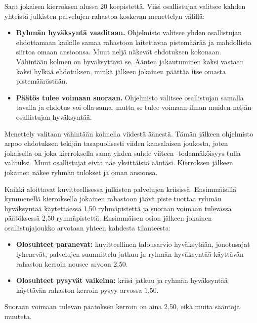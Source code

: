 Saat jokaisen kierroksen alussa 20 koepistettä. Viisi osallistujaa valitsee kahden yhteistä julkisten palvelujen rahastoa koskevan menettelyn välillä:
\begin{itemize}
  \item \textbf{Ryhmän hyväksyntä vaaditaan.} Ohjelmisto valitsee yhden osallistujan ehdottamaan kaikille samaa rahastoon laitettavaa pistemäärää ja mahdollista siirtoa omaan ansioonsa. Muut neljä näkevät ehdotuksen kokonaan. Vähintään kolmen on hyväksyttävä se. Äänten jakautuminen kaksi vastaan kaksi hylkää ehdotuksen, minkä jälkeen jokainen päättää itse omasta pistemäärästään.
  \item \textbf{Päätös tulee voimaan suoraan.} Ohjelmisto valitsee osallistujan samalla tavalla ja ehdotus voi olla sama, mutta se tulee voimaan ilman muiden neljän osallistujan hyväksyntää.
\end{itemize}
Menettely valitaan vähintään kolmella viidestä äänestä. Tämän jälkeen ohjelmisto arpoo ehdotuksen tekijän tasapuolisesti viiden kansalaisen joukosta, joten jokaisella on joka kierroksella sama yhden suhde viiteen -todennäköisyys tulla valituksi. Muut osallistujat eivät näe yksittäistä ääntäsi. Kierroksen jälkeen jokainen näkee ryhmän tulokset ja oman ansionsa.

\begin{infobox}
Kaikki aloittavat kuvitteellisessa julkisten palvelujen kriisissä. Ensimmäisillä kymmenellä kierroksella jokainen rahastoon jäävä piste tuottaa ryhmän hyväksyntää käytettäessä 1,50 ryhmäpistettä ja suoraan voimaan tulevassa päätöksessä 2,50 ryhmäpistettä. Ensimmäisen osion jälkeen jokainen osallistujajoukko arvotaan yhteen kahdesta tilanteesta:
\begin{itemize}
  \item \textbf{Olosuhteet paranevat:} kuvitteellinen talousarvio hyväksytään, jonotusajat lyhenevät, palvelujen suunnittelu jatkuu ja ryhmän hyväksyntää käyttävän rahaston kerroin nousee arvoon 2,50.
  \item \textbf{Olosuhteet pysyvät vaikeina:} kriisi jatkuu ja ryhmän hyväksyntää käyttävän rahaston kerroin pysyy arvossa 1,50.
\end{itemize}
Suoraan voimaan tulevan päätöksen kerroin on aina 2,50, eikä muita sääntöjä muuteta.
\end{infobox}

